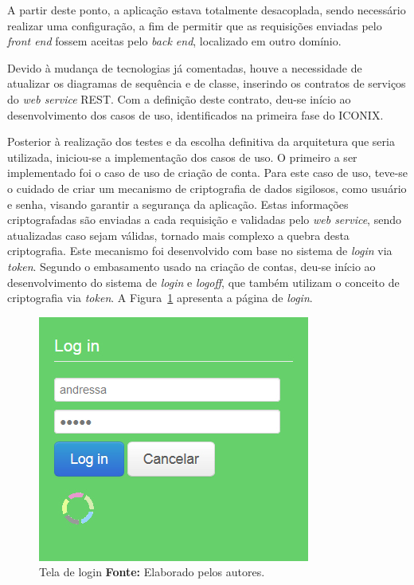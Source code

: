 \par A partir deste ponto, a aplicação estava totalmente desacoplada, sendo necessário realizar uma configuração, a fim de permitir que as requisições enviadas pelo \textit{front end} fossem aceitas pelo \textit{back end}, localizado em outro domínio.

\par Devido à mudança de tecnologias já comentadas, houve a necessidade de atualizar os diagramas de sequência e de classe, inserindo os contratos de serviços do \textit{web service} REST. Com a definição deste contrato, deu-se início ao desenvolvimento dos casos de uso, identificados na primeira fase do ICONIX. 

\par Posterior à realização dos testes e da escolha definitiva da arquitetura que seria utilizada, iniciou-se a implementação dos casos de uso. O primeiro a ser implementado foi o caso de uso de criação de conta. Para este caso de uso, teve-se o cuidado de criar um mecanismo de criptografia de dados sigilosos, como usuário e senha, visando garantir a segurança da aplicação. Estas informações criptografadas são enviadas a cada requisição e validadas pelo \textit{web service}, sendo atualizadas caso sejam válidas, tornado mais complexo a quebra desta criptografia. Este mecanismo foi desenvolvido com base no sistema de \textit{login} via \textit{token}. Segundo o embasamento usado na criação de contas, deu-se início ao desenvolvimento do sistema de \textit{login} e \textit{logoff}, que também utilizam o conceito de criptografia via \textit{token}. A Figura~\ref{fig:pagina_login} apresenta a página de \textit{login}.

\begin{figure}[h!]
	\centerline{\includegraphics[scale=0.60]{./imagens/login.jpg}}
	\caption[Tela de login ]
	{Tela de login \textbf{Fonte:} Elaborado pelos autores.}
	\label{fig:pagina_login}
\end{figure}

